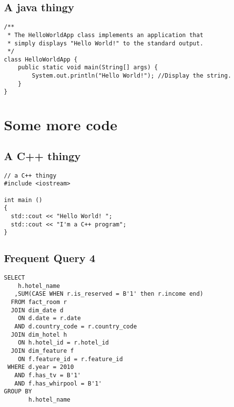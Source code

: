 \begin{appendices}
\newpage
\section{A java thingy}
\begin{lstlisting}[style=myJava]
/**
 * The HelloWorldApp class implements an application that
 * simply displays "Hello World!" to the standard output.
 */
class HelloWorldApp {
    public static void main(String[] args) {
        System.out.println("Hello World!"); //Display the string.
    }
}
\end{lstlisting}

\newpage

\chapter{Some more code}
\section{A C++ thingy}
\begin{lstlisting}[style=myC++]
// a C++ thingy
#include <iostream>

int main ()
{
  std::cout << "Hello World! ";
  std::cout << "I'm a C++ program";
}
\end{lstlisting}

\newpage
\section{Frequent Query 4}
\begin{lstlisting}[style=mySQL]
SELECT 
    h.hotel_name
   ,SUM(CASE WHEN r.is_reserved = B'1' then r.income end)
  FROM fact_room r
  JOIN dim_date d
    ON d.date = r.date
   AND d.country_code = r.country_code
  JOIN dim_hotel h
    ON h.hotel_id = r.hotel_id 
  JOIN dim_feature f
    ON f.feature_id = r.feature_id  
 WHERE d.year = 2010
   AND f.has_tv = B'1'
   AND f.has_whirpool = B'1'
GROUP BY
       h.hotel_name
\end{lstlisting}


\end{appendices}